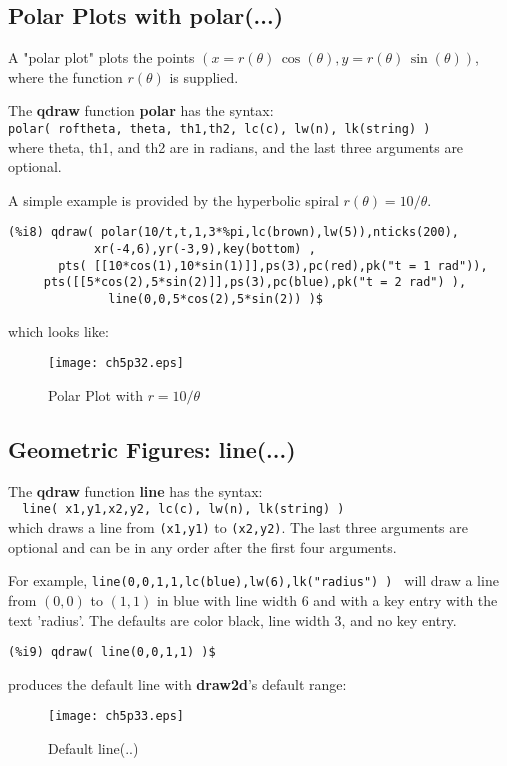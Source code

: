 \documentclass[12pt]{article}
\begin{document}
\newpage

\subsection{Polar Plots with polar(...) }
A "polar plot" plots the points $(x = r(\theta)\,\cos (\theta) ,y = r(\theta)\,\sin(\theta) )$,
  where the function $r(\theta)$ is supplied.

\smallskip
The \textbf{qdraw} function \textbf{polar} has the syntax:\\
  \verb|polar( roftheta, theta, th1,th2, lc(c), lw(n), lk(string) )|\\
  where theta, th1, and th2 are in radians, and the last three arguments
  are optional.
  
\smallskip
A simple example is provided by the hyperbolic spiral $r(\theta) = 10/\theta $.
\small
\begin{verbatim}
(%i8) qdraw( polar(10/t,t,1,3*%pi,lc(brown),lw(5)),nticks(200),
            xr(-4,6),yr(-3,9),key(bottom) ,
       pts( [[10*cos(1),10*sin(1)]],ps(3),pc(red),pk("t = 1 rad")),         
     pts([[5*cos(2),5*sin(2)]],ps(3),pc(blue),pk("t = 2 rad") ),
              line(0,0,5*cos(2),5*sin(2)) )$
\end{verbatim}
\normalsize
%
which looks like:
\begin{figure} [h]
   \centerline{\texttt{[image: ch5p32.eps]} }
	\caption{Polar Plot with $r = 10/\theta $ }
\end{figure}      
\newpage

\subsection{Geometric Figures: line(...) }
The \textbf{qdraw} function \textbf{line} has the syntax:\\
  \verb|  line( x1,y1,x2,y2, lc(c), lw(n), lk(string) ) |\\
  which draws a line from \verb|(x1,y1)| to \verb|(x2,y2)|.
The last three arguments are optional and can be in any order after
  the first four arguments.

\smallskip
For example, \verb|line(0,0,1,1,lc(blue),lw(6),lk("radius") ) | will draw
  a line from $(0,0)$ to $(1,1)$ in blue with line width $6$ and with
   a key entry with the text 'radius'. 
The defaults are color black, line width $3$, and no key entry.
\small
\begin{verbatim}
(%i9) qdraw( line(0,0,1,1) )$
\end{verbatim}
\normalsize
produces the default line with \textbf{draw2d}'s default range:
\begin{figure} [h]
   \centerline{\texttt{[image: ch5p33.eps]} }
	\caption{Default line(..) }
\end{figure}      
\end{document}
